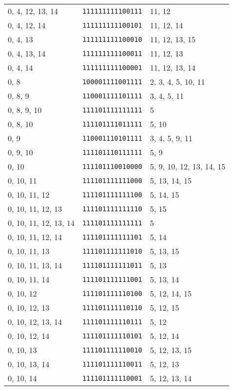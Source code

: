 \documentclass[a4paper,12pt]{article}
\begin{document}
\begin{longtable}{l|l|l}
        0, 4, 12, 13, 14&\texttt{111111111100111}&11, 12\\
        0, 4, 12, 14&\texttt{111111111100101}&11, 12, 14\\
        0, 4, 13&\texttt{111111111100010}&11, 12, 13, 15\\
        0, 4, 13, 14&\texttt{111111111100011}&11, 12, 13\\
        0, 4, 14&\texttt{111111111100001}&11, 12, 13, 14\\
        0, 8&\texttt{100001111001111}&2, 3, 4, 5, 10, 11\\
        0, 8, 9&\texttt{110001111101111}&3, 4, 5, 11\\
        0, 8, 9, 10&\texttt{111101111111111}&5\\
        0, 8, 10&\texttt{111101111011111}&5, 10\\
        0, 9&\texttt{110001110101111}&3, 4, 5, 9, 11\\
        0, 9, 10&\texttt{111101110111111}&5, 9\\
        0, 10&\texttt{111101110010000}&5, 9, 10, 12, 13, 14, 15\\
        0, 10, 11&\texttt{111101111111000}&5, 13, 14, 15\\
        0, 10, 11, 12&\texttt{111101111111100}&5, 14, 15\\
        0, 10, 11, 12, 13&\texttt{111101111111110}&5, 15\\
        0, 10, 11, 12, 13, 14&\texttt{111101111111111}&5\\
        0, 10, 11, 12, 14&\texttt{111101111111101}&5, 14\\
        0, 10, 11, 13&\texttt{111101111111010}&5, 13, 15\\
        0, 10, 11, 13, 14&\texttt{111101111111011}&5, 13\\
        0, 10, 11, 14&\texttt{111101111111001}&5, 13, 14\\
        0, 10, 12&\texttt{111101111110100}&5, 12, 14, 15\\
        0, 10, 12, 13&\texttt{111101111110110}&5, 12, 15\\
        0, 10, 12, 13, 14&\texttt{111101111110111}&5, 12\\
        0, 10, 12, 14&\texttt{111101111110101}&5, 12, 14\\
        0, 10, 13&\texttt{111101111110010}&5, 12, 13, 15\\
        0, 10, 13, 14&\texttt{111101111110011}&5, 12, 13\\
        0, 10, 14&\texttt{111101111110001}&5, 12, 13, 14\\

\end{longtable}
\end{document}

